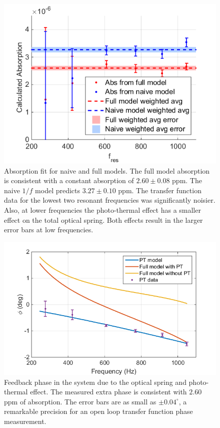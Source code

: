 \begin{figure}[htb]%
\includegraphics[width=\columnwidth]{figures/photothermal/newABS.png}%
\caption{Absorption fit for naive and full models. The full model absorption is consistent with a constant absorption of  $2.60\pm0.08$ ppm. The naive $1/f$ model predicts $3.27\pm0.10$ ppm. The transfer function data for the lowest two resonant frequencies was significantly noisier. Also, at lower frequencies the photo-thermal  effect has a smaller effect on the total optical spring. Both effects result in the larger error bars at low frequencies.}
\label{fig:abs}%
\end{figure}

\begin{figure}[htb]%
\includegraphics[width=\columnwidth]{figures/photothermal/newPhi.png}%
\caption{Feedback phase in the system due to the optical spring and photo-thermal effect. The measured extra phase is consistent with $2.60$ ppm of absorption. The error bars are as small as $\pm 0.04^{\circ}$, a remarkable precision for an open loop transfer function phase measurement.
}
\label{fig:phi}%
\end{figure}

